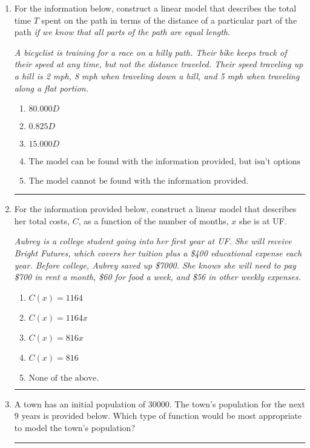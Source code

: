 \documentclass[14pt]{extbook}
\newcommand{\litem}[1]{\item#1\hspace*{-1cm}\rule{\textwidth}{0.4pt}}
\begin{document}
\begin{enumerate}
{\begin{enumerate}[label=\Alph*.]
\end{enumerate} }
\litem{
For the information below, construct a linear model that describes the total time $T$ spent on the path in terms of the distance of a particular part of the path \textit{if we know that all parts of the path are equal length}.
\begin{center}
    \textit{ A bicyclist is training for a race on a hilly path. Their bike keeps track of their speed at any time, but not the distance traveled. Their speed traveling up a hill is 2 mph, 8 mph when traveling down a hill, and 5 mph when traveling along a flat portion. }
\end{center}
\begin{enumerate}[label=\Alph*.]
\item \( 80.000 D \)
\item \( 0.825 D \)
\item \( 15.000 D \)
\item \( \text{The model can be found with the information provided, but isn't options 1-3.} \)
\item \( \text{The model cannot be found with the information provided.} \)

\end{enumerate} }
\litem{
For the information provided below, construct a linear model that describes her total costs, $C$, as a function of the number of months, $x$ she is at UF. 
\begin{center}
    \textit{ Aubrey is a college student going into her first year at UF. She will receive Bright Futures, which covers her tuition plus a \$400 educational expense each year. Before college, Aubrey saved up \$7000. She knows she will need to pay \$700 in rent a month, \$60 for food a week, and \$56 in other weekly expenses. }
\end{center}
\begin{enumerate}[label=\Alph*.]
\item \( C(x) = 1164 \)
\item \( C(x) = 1164 x \)
\item \( C(x) = 816 x \)
\item \( C(x) = 816 \)
\item \( \text{None of the above.} \)

\end{enumerate} }
\litem{
A town has an initial population of 30000. The town's population for the next 9 years is provided below. Which type of function would be most appropriate to model the town's population?

}
\end{enumerate}
\end{document}
